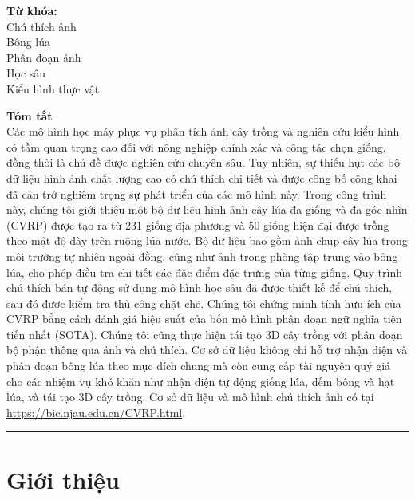 \documentclass[12pt, a4paper]{article}
\begin{document}
\noindent
\begin{minipage}[t]{0.28\linewidth}
  \small
  \textbf{Từ khóa:}\\
  Chú thích ảnh\\
  Bông lúa\\
  Phân đoạn ảnh\\
  Học sâu\\
  Kiểu hình thực vật
\end{minipage}%
\hfill
\begin{minipage}[t]{0.69\linewidth}
  \small
  \textbf{Tóm tắt}\\
  Các mô hình học máy phục vụ phân tích ảnh cây trồng và nghiên cứu kiểu hình có tầm quan
  trọng cao đối với nông nghiệp chính xác và công tác chọn giống, đồng thời là chủ đề được
  nghiên cứu chuyên sâu. Tuy nhiên, sự thiếu hụt các bộ dữ liệu hình ảnh chất lượng cao có
  chú thích chi tiết và được công bố công khai đã cản trở nghiêm trọng sự phát triển của các
  mô hình này. Trong công trình này, chúng tôi giới thiệu một bộ dữ liệu hình ảnh cây lúa đa
  giống và đa góc nhìn (CVRP) được tạo ra từ 231 giống địa phương và 50 giống hiện đại được
  trồng theo mật độ dày trên ruộng lúa nước. Bộ dữ liệu bao gồm ảnh chụp cây lúa trong môi
  trường tự nhiên ngoài đồng, cũng như ảnh trong phòng tập trung vào bông lúa, cho phép điều
  tra chi tiết các đặc điểm đặc trưng của từng giống. Quy trình chú thích bán tự động sử dụng
  mô hình học sâu đã được thiết kế để chú thích, sau đó được kiểm tra thủ công chặt chẽ.
  Chúng tôi chứng minh tính hữu ích của CVRP bằng cách đánh giá hiệu suất của bốn mô hình
  phân đoạn ngữ nghĩa tiên tiến nhất (SOTA). Chúng tôi cũng thực hiện tái tạo 3D cây trồng
  với phân đoạn bộ phận thông qua ảnh và chú thích. Cơ sở dữ liệu không chỉ hỗ trợ nhận
  diện và phân đoạn bông lúa theo mục đích chung mà còn cung cấp tài nguyên quý giá cho các
  nhiệm vụ khó khăn như nhận diện tự động giống lúa, đếm bông và hạt lúa, và tái tạo 3D cây
  trồng. Cơ sở dữ liệu và mô hình chú thích ảnh có tại
  \href{https://bic.njau.edu.cn/CVRP.html}{https://bic.njau.edu.cn/CVRP.html}.
\end{minipage}

\noindent\rule{\linewidth}{0.4pt}
\vspace{0.3cm}

\section{Giới thiệu}
\end{document}
